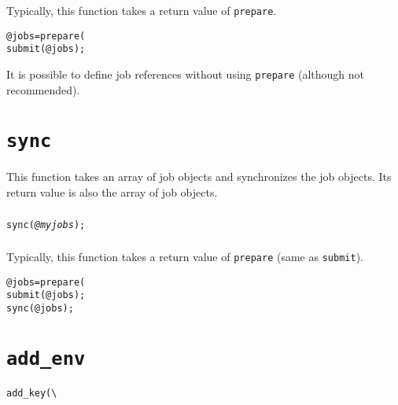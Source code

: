 \documentclass[a4paper,10pt]{report}
\def\|{\verb|} %|
\begin{document}
\subsubsection{\example}
Typically, this function takes a return value of \texttt{prepare}.
\begin{boxnote}
\begin{alltt}
@jobs = prepare(%mytemplate);
submit(@jobs);
\end{alltt}
\end{boxnote}
\vspace{\baselineskip}
It is possible to define job references without using
\texttt{prepare} (although not recommended).

\section{\texttt{sync}}

This function takes an array of job objects and synchronizes the job objects.
Its return value is also the array of job objects.

\subsubsection{\format}

\begin{boxnote}
\begin{alltt}
sync(\textit{@myjobs});
\end{alltt}
\end{boxnote}
\vspace{\baselineskip}

\subsubsection{\example}

Typically, this function takes a return value of \texttt{prepare}
(same as \texttt{submit}).
\begin{boxnote}
\begin{alltt}
@jobs = prepare(%mytemplate);
submit(@jobs);
sync(@jobs);
\end{alltt}
\end{boxnote}

\section{\texttt{add\_env}}

\begin{boxnote}
\begin{alltt}
add_key(\|\|%\textit{env});
\end{alltt}
\end{boxnote}
\end{document}
